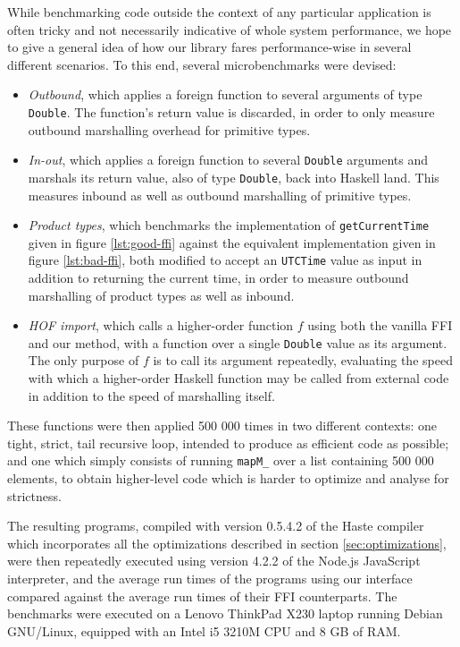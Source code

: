 \documentclass[preprint]{sigplanconf}
\begin{document}
While benchmarking code outside the context of any particular application is
often tricky and not necessarily indicative of whole system performance,
we hope to give a general idea of how our library fares performance-wise in
several different scenarios.
To this end, several microbenchmarks were devised:

\begin{itemize}
\item
  \emph{Outbound}, which applies a foreign function to several arguments of
  type \lstinline!Double!. The function's return value is discarded, in order
  to only measure outbound marshalling overhead for primitive types.
\item
  \emph{In-out}, which applies a foreign function to several \lstinline!Double!
  arguments and marshals its return value, also of type \lstinline!Double!,
  back into Haskell land. This measures inbound as well as outbound marshalling
  of primitive types.
\item
  \emph{Product types}, which benchmarks the implementation of\linebreak
  \lstinline!getCurrentTime! given in figure \ref{lst:good-ffi} against
  the equivalent implementation given in figure \ref{lst:bad-ffi}, both
  modified to accept an \lstinline!UTCTime! value as input in addition to
  returning the current time, in order to measure outbound marshalling of
  product types as well as inbound.
\item
  \emph{HOF import}, which calls a higher-order function $f$ using
  both the vanilla FFI and our method, with a function over a
  single \lstinline!Double! value as its argument.
  The only purpose of $f$ is to call its argument repeatedly,
  evaluating the speed with which a higher-order Haskell function may be called
  from external code in addition to the speed of marshalling itself.
\end{itemize}

These functions were then applied 500 000 times in two different contexts: one
tight, strict, tail recursive loop, intended to produce as efficient code
as possible; and one which simply consists of running \lstinline!mapM_! over
a list containing 500 000 elements, to obtain higher-level code which is harder to
optimize and analyse for strictness.

The resulting programs, compiled with version 0.5.4.2 of the Haste compiler
which incorporates all the optimizations described in section \ref{sec:optimizations},
were then repeatedly executed using version 4.2.2 of the Node.js JavaScript interpreter,
and the average run times of the programs using our interface compared against
the average run times of their FFI counterparts.
The benchmarks were executed on a Lenovo ThinkPad X230 laptop running Debian GNU/Linux,
equipped with an Intel i5 3210M CPU and 8 GB of RAM.
\end{document}
